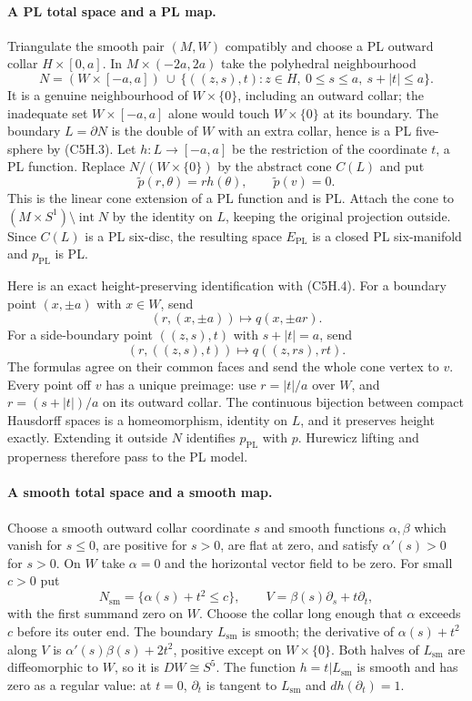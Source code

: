 \paragraph{A PL total space and a PL map.}
Triangulate the smooth pair $(M,W)$ compatibly and choose a PL outward
collar $H\times[0,a]$.  In $M\times(-2a,2a)$ take the polyhedral
neighbourhood
\[
 N=(W\times[-a,a])\ \cup\
   \{((z,s),t):z\in H,\ 0\le s\le a,\ s+|t|\le a\}.
 \tag{C5H.6}
\]
It is a genuine neighbourhood of $W\times\{0\}$, including an outward
collar; the inadequate set $W\times[-a,a]$ alone would touch $W\times\{0\}$
at its boundary.  The boundary $L=\partial N$ is the double of $W$ with an
extra collar, hence is a PL five-sphere by (C5H.3).  Let
$h:L\to[-a,a]$ be the restriction of the coordinate $t$, a PL function.
Replace $N/(W\times\{0\})$ by the abstract cone $C(L)$ and put
\[
 \widetilde p(r,\theta)=r h(\theta),\qquad \widetilde p(v)=0.
 \tag{C5H.7}
\]
This is the linear cone extension of a PL function and is PL.  Attach the
cone to $(M\times S^1)\setminus\operatorname{int}N$ by the identity on $L$,
keeping the original projection outside.  Since $C(L)$ is a PL six-disc,
the resulting space $E_{\mathrm{PL}}$ is a closed PL six-manifold and
$p_{\mathrm{PL}}$ is PL.

Here is an exact height-preserving identification with (C5H.4).  For a
boundary point $(x,\pm a)$ with $x\in W$, send
\[
 (r,(x,\pm a))\longmapsto q(x,\pm ar).
\]
For a side-boundary point $((z,s),t)$ with $s+|t|=a$, send
\[
 (r,((z,s),t))\longmapsto q((z,rs),rt).
\]
The formulas agree on their common faces and send the whole cone vertex
to $v$.  Every point off $v$ has a unique preimage: use $r=|t|/a$ over $W$,
and $r=(s+|t|)/a$ on its outward collar.  The continuous bijection between
compact Hausdorff spaces is a homeomorphism, identity on $L$, and it
preserves height exactly.  Extending it outside $N$ identifies
$p_{\mathrm{PL}}$ with $p$.  Hurewicz lifting and properness therefore pass
to the PL model.

\paragraph{A smooth total space and a smooth map.}
Choose a smooth outward collar coordinate $s$ and smooth functions
$\alpha,\beta$ which vanish for $s\le0$, are positive for $s>0$, are flat
at zero, and satisfy $\alpha'(s)>0$ for $s>0$.  On $W$ take $\alpha=0$ and
the horizontal vector field to be zero.  For small $c>0$ put
\[
 N_{\mathrm{sm}}=\{\alpha(s)+t^2\le c\},\qquad
 V=\beta(s)\partial_s+t\partial_t,
 \tag{C5H.8}
\]
with the first summand zero on $W$.  Choose the collar long enough that
$\alpha$ exceeds $c$ before its outer end.  The boundary $L_{\mathrm{sm}}$
is smooth; the derivative of $\alpha(s)+t^2$ along $V$ is
$\alpha'(s)\beta(s)+2t^2$, positive except on $W\times\{0\}$.
Both halves of $L_{\mathrm{sm}}$ are diffeomorphic to $W$, so it is
$DW\cong S^5$.  The function $h=t|L_{\mathrm{sm}}$ is smooth and has zero
as a regular value: at $t=0$, $\partial_t$ is tangent to $L_{\mathrm{sm}}$
and $dh(\partial_t)=1$.

